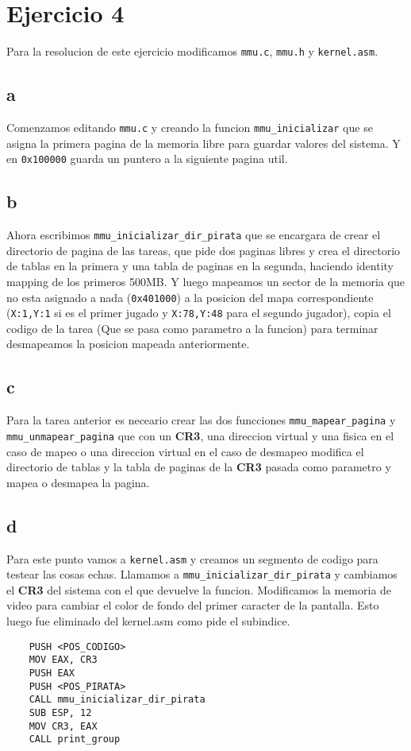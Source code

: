 \section{Ejercicio 4}

Para la resolucion de este ejercicio modificamos \texttt{mmu.c}, \texttt{mmu.h} y \texttt{kernel.asm}.

\subsection{a}
Comenzamos editando \texttt{mmu.c} y creando la funcion \texttt{mmu\_inicializar} que se asigna la primera pagina de la memoria libre para guardar valores del sistema. Y en \texttt{0x100000} guarda un puntero a la siguiente pagina util.

\subsection{b}
Ahora escribimos \texttt{mmu\_inicializar\_dir\_pirata} que se encargara de crear el directorio de pagina de las tareas, que pide dos paginas libres y crea el directorio de tablas en la primera y una tabla de paginas en la segunda, haciendo identity mapping de los primeros 500MB. Y luego mapeamos un sector de la memoria que no esta asignado a nada (\texttt{0x401000}) a la posicion del mapa correspondiente (\texttt{X:1,Y:1} si es el primer jugado y \texttt{X:78,Y:48} para el segundo jugador), copia el codigo de la tarea (Que se pasa como parametro a la funcion) para terminar desmapeamos la posicion mapeada anteriormente.

\subsection{c}
Para la tarea anterior es neceario crear las dos funcciones \texttt{mmu\_mapear\_pagina} y \texttt{mmu\_unmapear\_pagina} que con un \textbf{CR3}, una direccion virtual y una fisica en el caso de mapeo o una direccion virtual en el caso de desmapeo modifica el directorio de tablas y la tabla de paginas de la \textbf{CR3} pasada como parametro y mapea o desmapea la pagina.

\subsection{d}
Para este punto vamos a \texttt{kernel.asm} y creamos un segmento de codigo para testear las cosas echas. Llamamos a \texttt{mmu\_inicializar\_dir\_pirata} y cambiamos el \textbf{CR3} del sistema con el que devuelve la funcion. Modificamos la memoria de video para cambiar el color de fondo del primer caracter de la pantalla. Esto luego fue eliminado del kernel.asm como pide el subindice.\\

\begin{lstlisting}
	PUSH <POS_CODIGO>
    MOV EAX, CR3
    PUSH EAX
    PUSH <POS_PIRATA>
    CALL mmu_inicializar_dir_pirata
    SUB ESP, 12
    MOV CR3, EAX
    CALL print_group
\end{lstlisting}